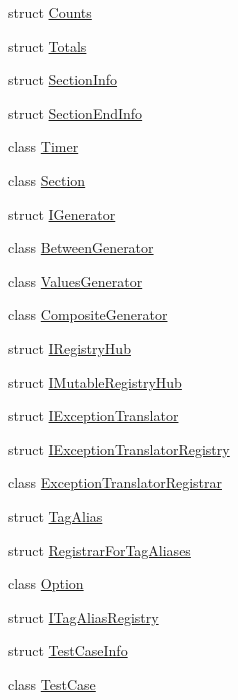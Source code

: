 \begin{DoxyCompactItemize}
struct \hyperlink{struct_catch_1_1_counts}{Counts}
\item 
struct \hyperlink{struct_catch_1_1_totals}{Totals}
\item 
struct \hyperlink{struct_catch_1_1_section_info}{Section\-Info}
\item 
struct \hyperlink{struct_catch_1_1_section_end_info}{Section\-End\-Info}
\item 
class \hyperlink{class_catch_1_1_timer}{Timer}
\item 
class \hyperlink{class_catch_1_1_section}{Section}
\item 
struct \hyperlink{struct_catch_1_1_i_generator}{I\-Generator}
\item 
class \hyperlink{class_catch_1_1_between_generator}{Between\-Generator}
\item 
class \hyperlink{class_catch_1_1_values_generator}{Values\-Generator}
\item 
class \hyperlink{class_catch_1_1_composite_generator}{Composite\-Generator}
\item 
struct \hyperlink{struct_catch_1_1_i_registry_hub}{I\-Registry\-Hub}
\item 
struct \hyperlink{struct_catch_1_1_i_mutable_registry_hub}{I\-Mutable\-Registry\-Hub}
\item 
struct \hyperlink{struct_catch_1_1_i_exception_translator}{I\-Exception\-Translator}
\item 
struct \hyperlink{struct_catch_1_1_i_exception_translator_registry}{I\-Exception\-Translator\-Registry}
\item 
class \hyperlink{class_catch_1_1_exception_translator_registrar}{Exception\-Translator\-Registrar}
\item 
struct \hyperlink{struct_catch_1_1_tag_alias}{Tag\-Alias}
\item 
struct \hyperlink{struct_catch_1_1_registrar_for_tag_aliases}{Registrar\-For\-Tag\-Aliases}
\item 
class \hyperlink{class_catch_1_1_option}{Option}
\item 
struct \hyperlink{struct_catch_1_1_i_tag_alias_registry}{I\-Tag\-Alias\-Registry}
\item 
struct \hyperlink{struct_catch_1_1_test_case_info}{Test\-Case\-Info}
\item 
class \hyperlink{class_catch_1_1_test_case}{Test\-Case}
\end{DoxyCompactItemize}
